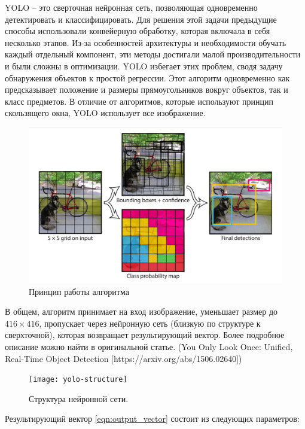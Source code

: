 YOLO  – это сверточная нейронная сеть, позволяющая одновременно детектировать и классифицировать. Для решения этой задачи предыдущие способы использовали конвейерную обработку, которая включала в себя несколько этапов. Из-за особенностей архитектуры и необходимости обучать каждый отдельный компонент, эти методы достигали малой производительности и были сложны в оптимизации. YOLO избегает этих проблем, сводя задачу обнаружения объектов к простой регрессии. Этот алгоритм одновременно как предсказывает положение и размеры прямоугольников вокруг объектов, так и класс предметов. В отличие от алгоритмов, которые используют принцип скользящего окна, YOLO использует все изображение. 

\begin{figure}
	\centering
	\includegraphics[width=0.7\linewidth]{images/process}
	\caption{Принцип работы алгоритма}
	\label{fig:process}
\end{figure}



В общем, алгоритм принимает на вход изображение, уменьшает размер до $416 \times 416$, пропускает через нейронную сеть (близкую по структуре к сверхточной), которая возвращает результирующий вектор. Более подробное описание можно найти в оригинальной статье. (You Only Look Once:
Unified, Real-Time Object Detection [https://arxiv.org/abs/1506.02640])


\begin{figure}
	\centering
	\texttt{[image: yolo-structure]}
	\caption{Структура нейронной сети.}
	\label{fig:the-framework-of-yolov3-neural-network-for-ship-detection}
\end{figure}

Результирующий вектор \eqref{eqn:output_vector} состоит из следующих параметров:

